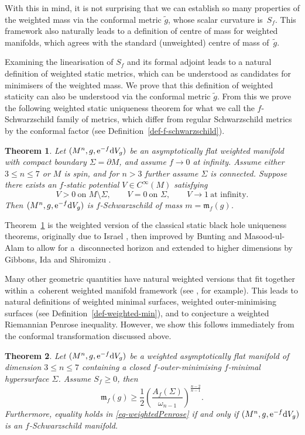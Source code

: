 \documentclass[10pt,a4paper]{amsart}
\numberwithin{equation}{section}
\newtheorem{Theorem}{Theorem}[section]
\theoremstyle{definition}
\begin{document}
With this in mind, it is not surprising that we can establish so many properties of the weighted mass via the conformal metric $\widetilde g$, whose scalar curvature is~$S_f$. This framework also naturally leads to a definition of centre of mass for weighted manifolds, which agrees with the standard (unweighted) centre of mass of~$\widetilde g$.

Examining the linearisation of $S_f$ and its formal adjoint leads to a natural definition of weighted static metrics, which can be understood as candidates for minimisers of the weighted mass. We prove that this definition of weighted staticity can also be understood via the conformal metric $\widetilde g$. From this we prove the following weighted static uniqueness theorem for what we call the $f$-Schwarzschild family of metrics, which differ from regular Schwarzschild metrics by the conformal factor  (see Definition~\ref{def-f-schwarzschild}).
\begin{Theorem}\label{thm-fstatic-bh-rigidity-intro}
	Let $(M^n,g,{\rm e}^{-f}{\rm d}V_g)$ be an asymptotically flat weighted manifold with compact boundary
	$\Sigma=\partial M$, and assume $f\to 0$ at infinity.
	Assume either $3\le n\le 7$ or $M$ is spin, and for $n>3$ further assume $\Sigma$ is connected.
Suppose there exists an $f$-static potential $V\in C^\infty(M)$ satisfying
	\[
	V>0\ \text{on }M\setminus\Sigma,\qquad V=0\ \text{on }\Sigma,\qquad V\to 1\ \text{at infinity}.
	\]
Then $(M^n,g,{\rm e}^{-f}{\rm d}V_g)$ is $f$-Schwarzschild of mass $m=\mathfrak{m}_f(g)$.
\end{Theorem}

Theorem~\ref{thm-fstatic-bh-rigidity-intro} is the weighted version of the classical static black hole uniqueness theorems, originally due to Israel \cite{israel1967event}, then improved by Bunting and Masood-ul-Alam \cite{BuntingMasoodUlAlam87} to allow for a~disconnected horizon and extended to higher dimensions by Gibbons, Ida and Shiromizu \cite{GibbonsIdaShiromizu02}.


Many other geometric quantities have natural weighted versions that fit together within a~coherent weighted manifold framework (see \cite[Table~1]{BaldaufOzuch22}, for example). This leads to natural definitions of weighted minimal surfaces, weighted outer-minimising surfaces (see Definition~\ref{def-weighted-min}), and to conjecture a weighted Riemannian Penrose inequality. However, we show this follows immediately from the conformal transformation discussed above.
\begin{Theorem}\label{thm-weightedPenrose-intro}
	Let $(M^n,g,{\rm e}^{-f}{\rm d}V_g)$ be a weighted asymptotically flat manifold of dimension $3\le n\le 7$ containing a closed $f$-outer-minimising $f$-minimal hypersurface $\Sigma$. Assume $S_f\ge 0$, then
	\begin{equation}\label{eq-weightedPenrose}
		\mathfrak{m}_f(g) \ge \frac12\left(\frac{A_f(\Sigma)}{\omega_{n-1}}\right)^{\frac{n-2}{n-1}}.
	\end{equation}
	Furthermore, equality holds in \eqref{eq-weightedPenrose} if and only if $(M^n,g,{\rm e}^{-f}{\rm d}V_g)$ is an $f$-Schwarzschild manifold.
\end{Theorem}
\end{document}
